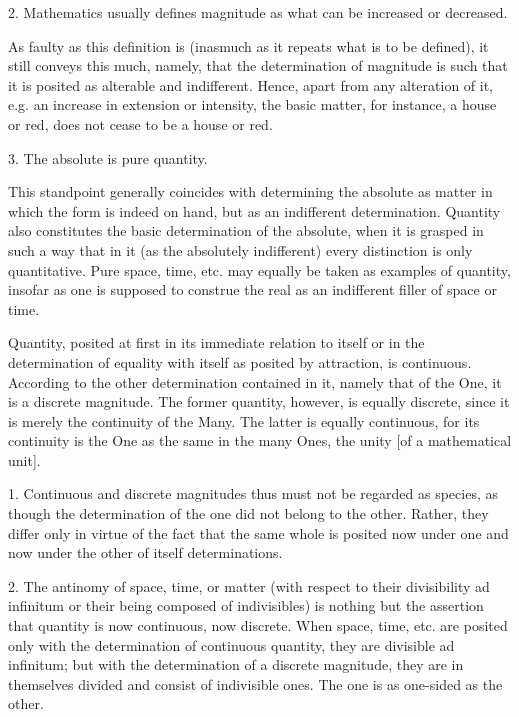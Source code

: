     2. Mathematics usually defines magnitude as what can be increased or decreased.

    As faulty as this definition is
    (inasmuch as it repeats what is to be defined),
    it still conveys this much, namely,
    that the determination of magnitude is such that
    it is posited as alterable and indifferent.
    Hence, apart from any alteration of it,
    e.g. an increase in extension or intensity,
    the basic matter, for instance, a house or red,
    does not cease to be a house or red.

    3. The absolute is pure quantity.

    This standpoint generally coincides with determining the absolute as
    matter in which the form is indeed on hand, but as an indifferent determination.
    Quantity also constitutes the basic determination of the absolute,
    when it is grasped in such a way that in it (as the absolutely indifferent)
    every distinction is only quantitative.
    Pure space, time, etc. may equally be taken as examples of quantity,
    insofar as one is supposed to construe the real as
    an indifferent filler of space or time.

Quantity, posited at first in its immediate relation to itself
or in the determination of equality with itself
as posited by attraction, is continuous.
According to the other determination contained in it,
namely that of the One, it is a discrete magnitude.
The former quantity, however, is equally discrete,
since it is merely the continuity of the Many.
The latter is equally continuous,
for its continuity is the One
as the same in the many Ones,
the unity [of a mathematical unit].

    1. Continuous and discrete magnitudes thus must not be regarded as species,
    as though the determination of the one did not belong to the other.
    Rather, they differ only in virtue of the fact that the same whole is
    posited now under one and now under the other of itself determinations.

    2. The antinomy of space, time, or matter
    (with respect to their divisibility ad infinitum or
    their being composed of indivisibles)
    is nothing but the assertion that quantity is
    now continuous, now discrete.
    When space, time, etc. are posited only with
    the determination of continuous quantity,
    they are divisible ad infinitum;
    but with the determination of a discrete magnitude,
    they are in themselves divided and consist of indivisible ones.
    The one is as one-sided as the other.

